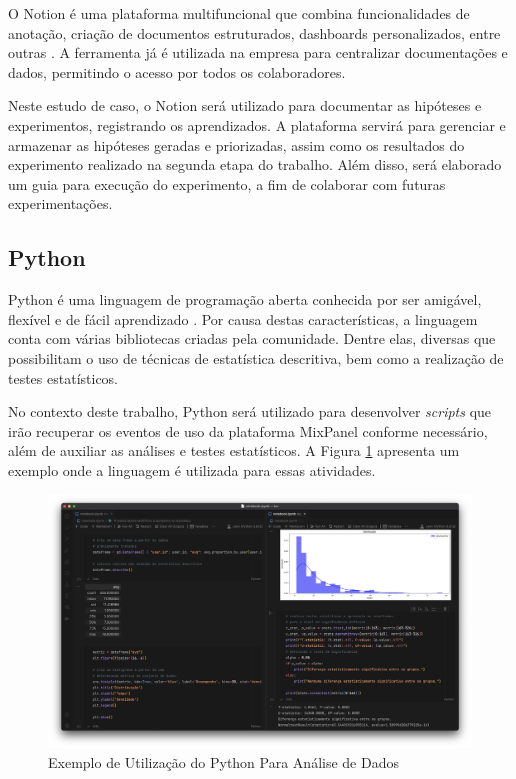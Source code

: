 O Notion é uma plataforma multifuncional que combina funcionalidades de anotação, criação de documentos estruturados, dashboards personalizados, entre outras \cite{notion}. A ferramenta já é utilizada na empresa para centralizar documentações e dados, permitindo o acesso por todos os colaboradores.

Neste estudo de caso, o Notion será utilizado para documentar as hipóteses e experimentos, registrando os aprendizados. A plataforma servirá para gerenciar e armazenar as hipóteses geradas e priorizadas, assim como os resultados do experimento realizado na segunda etapa do trabalho. Além disso, será elaborado um guia para execução do experimento, a fim de colaborar com futuras experimentações.

\subsection{Python}

Python é uma linguagem de programação aberta conhecida por ser amigável, flexível e de fácil aprendizado \cite{python}. Por causa destas características, a linguagem conta com várias bibliotecas criadas pela comunidade. Dentre elas, diversas que possibilitam o uso de técnicas de estatística descritiva, bem como a realização de testes estatísticos.

No contexto deste trabalho, Python será utilizado para desenvolver \textit{scripts} que irão recuperar os eventos de uso da plataforma MixPanel conforme necessário, além de auxiliar as análises e testes estatísticos. A Figura \ref{fig:python} apresenta um exemplo onde a linguagem é utilizada para essas atividades.


\begin{figure}
    \centering
    \caption{Exemplo de Utilização do Python Para Análise de Dados}
    \includegraphics[width=1\linewidth]{figuras/python.png}
    \begin{center}
    \end{center}
    \label{fig:python}
\end{figure}
